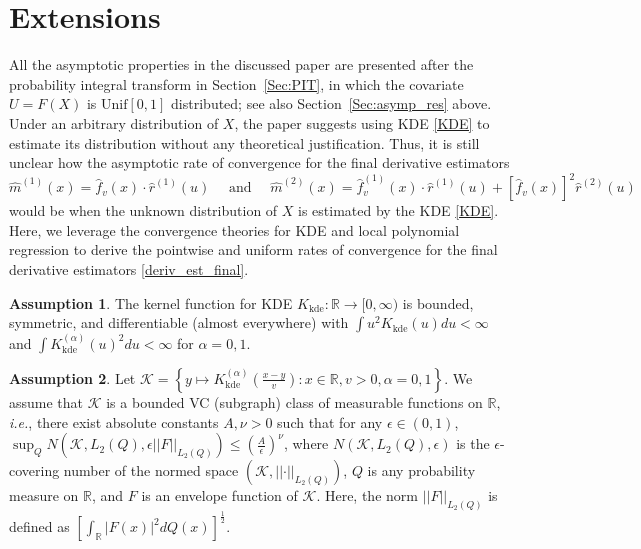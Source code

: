 \documentclass{uwstat572}
\theoremstyle{definition}
\newtheorem{assump}{Assumption}
\newcommand{\norm}[1]{\left|\left| #1 \right|\right|}
\renewcommand{\hat}{\widehat}
\theoremstyle{theorem}
\begin{document}
\section{Extensions}
\label{Sec:extension}

All the asymptotic properties in the discussed paper \citep{liu2020smoothed} are presented after the probability integral transform in Section~\ref{Sec:PIT}, in which the covariate $U=F(X)$ is $\mathrm{Unif}[0,1]$ distributed; see also Section~\ref{Sec:asymp_res} above. Under an arbitrary distribution of $X$, the paper suggests using KDE \eqref{KDE} to estimate its distribution without any theoretical justification. Thus, it is still unclear how the asymptotic rate of convergence for the final derivative estimators
\begin{equation}
\label{deriv_est_final}
\hat{m}^{(1)}(x) = \hat{f}_v(x) \cdot \hat{r}^{(1)}(u) \quad \text{ and }\quad \hat{m}^{(2)}(x) = \hat{f}_v^{(1)}(x) \cdot \hat{r}^{(1)}(u) + \left[\hat{f}_v(x)\right]^2 \hat{r}^{(2)}(u)
\end{equation} 
would be when the unknown distribution of $X$ is estimated by the KDE \eqref{KDE}. Here, we leverage the convergence theories for KDE \citep{gine2002rates,Einmahl2005uniform,chacon2011asymptotics} and local polynomial regression \citep{francisco2003uniform} to derive the pointwise and uniform rates of convergence for the final derivative estimators \eqref{deriv_est_final}. 
\begin{assump}
\label{assump:kernel_KDE}
The kernel function for KDE $K_{\text{kde}}:\mathbb{R}\to [0,\infty)$ is bounded, symmetric, and differentiable (almost everywhere) with $\int u^2 K_{\text{kde}}(u) du<\infty$ and $\int K_{\text{kde}}^{(\alpha)}(u)^2 du < \infty$ for $\alpha=0,1$.
\end{assump}
\begin{assump}
\label{assump:kernel_VC}
Let $\mathcal{K} = \left\{y\mapsto K_{\text{kde}}^{(\alpha)}\left(\frac{x-y}{v}\right): x\in \mathbb{R}, v>0, \alpha=0,1 \right\}$. We assume that $\mathcal{K}$ is a bounded VC (subgraph) class of measurable functions on $\mathbb{R}$, \emph{i.e.}, there exist absolute constants $A,\nu >0$ such that for any $\epsilon\in (0,1)$, 
$\sup_Q N\left(\mathcal{K}, L_2(Q), \epsilon\norm{F}_{L_2(Q)}\right) \leq \left(\frac{A}{\epsilon}\right)^{\nu}$, where $N\left(\mathcal{K}, L_2(Q), \epsilon\right)$ is the $\epsilon$-covering number of the normed space $\left(\mathcal{K}, \norm{\cdot}_{L_2(Q)}\right)$, $Q$ is any probability measure on $\mathbb{R}$, and $F$ is an envelope function of $\mathcal{K}$. Here, the norm $\norm{F}_{L_2(Q)}$ is defined as $\left[\int_{\mathbb{R}} |F(x)|^2 dQ(x)\right]^{\frac{1}{2}}$.
\end{assump}
\end{document}
